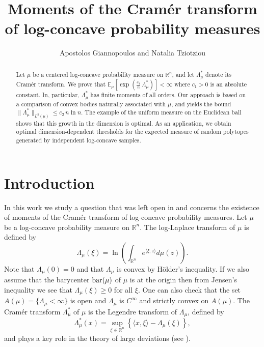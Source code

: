 \documentclass[11pt,leqno]{article}
\theoremstyle{definition}
\theoremstyle{remark}
\numberwithin{equation}{section}
\newcommand{\ls}{\leqslant}
\newcommand{\gr}{\geqslant}
\newcommand{\1}{\textbf{1}}
\begin{document}
\small

\title{\bf Moments of the Cram\'{e}r transform of log-concave probability measures}

\medskip

\author{Apostolos Giannopoulos and Natalia Tziotziou}

\date{}
\maketitle

\begin{abstract}\footnotesize Let $\mu$ be a centered log-concave probability measure on $\mathbb{R}^n$, and let $\Lambda_\mu^\ast$ denote its Cram\'er transform. We prove that
$\mathbb{E}_{\mu}\left[\exp\left(\frac{c_1}{n}\,\Lambda_{\mu}^{\ast}\right)\right] < \infty$ 
where $c_1>0$ is an absolute constant. In, particular, $\Lambda_{\mu}^{\ast}$ has finite moments of all orders. 
Our approach is based on a comparison of convex bodies naturally associated with $\mu$, and yields the bound
$\|\Lambda_\mu^\ast\|_{L^2(\mu)} \ls c_2\, n \ln n.$
The example of the uniform measure on the Euclidean ball shows that this growth in the dimension is optimal.  As an application, we obtain optimal dimension-dependent 
thresholds for the expected measure of random polytopes generated by independent log-concave samples.
\end{abstract}



\section{Introduction}

In this work we study a question that was left open in \cite{BGP-threshold} and concerns the existence of moments of
the Cram\'{e}r transform of log-concave probability measures. Let $\mu$ be a log-concave probability measure on ${\mathbb R}^n$.
The log-Laplace transform of $\mu$ is defined by
\begin{equation*}\Lambda_{\mu }(\xi )=\ln\left(\int_{{\mathbb R}^n}e^{\langle\xi
,z\rangle }d\mu(z)\right).\end{equation*}
Note that $\Lambda_{\mu}(0)=0$ and that $\Lambda_{\mu }$ is convex by H\"{o}lder's inequality. If we also
assume that the barycenter ${\rm bar}(\mu )$ of $\mu$ is at the origin then from Jensen's inequality
we see that $\Lambda_{\mu }(\xi )\gr 0$ for all $\xi $. One can also check that the set $A(\mu )=\{\Lambda_{\mu }<\infty\}$
is open and $\Lambda_{\mu }$ is $C^{\infty }$ and strictly convex on $A(\mu )$.
The Cram\'{e}r transform $\Lambda_{\mu}^{\ast }$ of $\mu $ is the Legendre transform of $\Lambda_{\mu}$, defined by
\begin{equation*}\Lambda_{\mu }^{\ast }(x)= \sup_{\xi\in {\mathbb R}^n} \left\{ \langle x, \xi\rangle - \Lambda_{\mu }(\xi )\right\},\end{equation*}
and plays a key role in the theory of large deviations (see \cite{Dembo-Zeitouni-book}).
\end{document}
